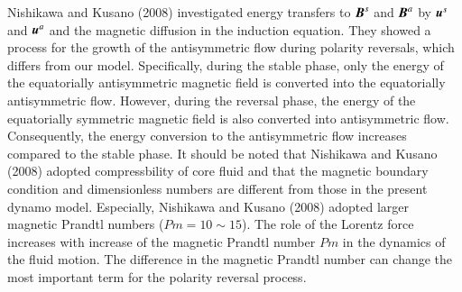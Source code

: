 Nishikawa and Kusano (2008) %
investigated energy transfers to $\mbox{\boldmath$B$}^s$ and $\mbox{\boldmath$B$}^a$ by $\mbox{\boldmath$u$}^s$ and $\mbox{\boldmath$u$}^a$ and the magnetic diffusion in the induction equation.
{\color{teal}
They showed a process for the growth of the antisymmetric flow during polarity reversals, which differs from our model.
Specifically, during the stable phase, only the energy of the equatorially antisymmetric magnetic field is converted into the equatorially antisymmetric flow. However, during the reversal phase, the energy of the equatorially symmetric magnetic field is also converted into antisymmetric flow. Consequently, the energy conversion to the antisymmetric flow increases compared to the stable phase.
}
It should be noted that Nishikawa and Kusano (2008) adopted compressbility of core fluid and that the magnetic boundary condition and dimensionless numbers are different from those in the present dynamo model.
Especially, Nishikawa and Kusano (2008) adopted larger magnetic Prandtl numbers ($Pm = 10 \sim 15$). 
The role of the Lorentz force increases with increase of the magnetic Prandtl number $Pm$ in the dynamics of the fluid motion.
The difference in the magnetic Prandtl number can change the most important term for the polarity reversal process. 


